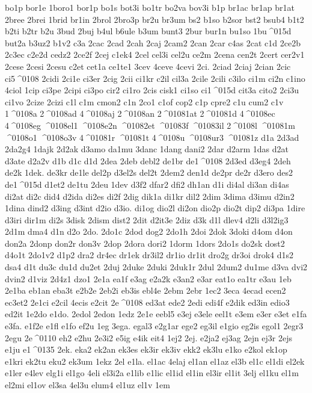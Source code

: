 {bo1p
bor1e
1boro1
bor1p
bo1s
bot3i
bo1tr
bo2va
bov3i
b1p
br1ac
br1ap
br1at
2bree
2brei
1brid
br1in
2brol
2bro3p
br2u
br3um
bs2
b1so
b2sor
bst2
bsub4
b1t2
b2ti
b2tr
b2u
3bud
2buj
b4ul
b6ule
b3um
bunt3
2bur
bur1n
bu1so
1bu^^^^015d
but2a
b3uz2
b1v2
c3a
2cac
2cad
2cah
2caj
2cam2
2can
2car
c4as
2cat
c1d
2ce2b
2c3ec
c2e2d
cedz2
2ce2f
2cej
c1ek4
2cel
cel3i
cel2u
ce2m
2cena
cen2t
2cert
cer2v1
2cese
2cesi
2cesu
c2et
cet1a
ce1te1
3cev
4ceve
4cevi
2ci.
2ciad
2ciaj
2cian
2cic
ci5^^^^0108
2cidi
2ci1e
ci3er
2cig
2cii
ci1kr
c2il
cil3a
2cile
2cili
c3ilo
ci1m
ci2n
c1ino
4ciol
1cip
ci3pe
2cipi
ci3po
cir2
ci1ro
2cis
cisk1
ci1so
ci1^^^^015d
cit3a
cito2
2ci3u
ci1vo
2cize
2cizi
c1l
c1m
cmon2
c1n
2co1
c1of
cop2
c1p
cpre2
c1u
cum2
c1v
1^^^^0108a
2^^^^0108ad
4^^^^0108aj
2^^^^0108an
2^^^^01081at
2^^^^01081d
4^^^^0108ec
4^^^^0108eg
^^^^0108el1
^^^^0108e2n
^^^^01082et
^^^^01083f
^^^^01083il
2^^^^0108l
^^^^01081m
^^^^0108o1
^^^^0108o3v
4^^^^01081r
^^^^01081t
4^^^^0108u
^^^^0108ur3
^^^^01081z
d1a
2d3ad
2da2g4
1dajk
2d2ak
d3amo
da1mu
3danc
1dang
dani2
2dar
d2arm
1das
d2at
d3ate
d2a2v
d1b
d1c
d1d
2dea
2deb
debl2
de1br
de1^^^^0108
2d3ed
d3eg4
2deh
de2k
1dek.
de3kr
de1le
del2p
d3el2s
del2t
2dem2
den1d
de2pr
de2r
d3ero
des2
de1^^^^015d
d1et2
de1tu
2deu
1dev
d3f2
dfar2
dfi2
dh1an
d1i
di4al
di3an
di4as
di2at
di2c
did4
d2ida
di2es
di2f
2dig
dik1a
di1kr
dil2
2dim
3dima
d3imu
d2in2
1dina
dind2
d3ing
d3int
d2io
d3io.
di1og
dio2l
di2on
dio2p
dio2t
dip2
di3pa
1dire
d3iri
dir1m
di2s
3disk
2dism
dist2
2dit
d2it3e
2diz
d3k
d1l
dlev4
d2li
d3l2ig3
2d1m
dma4
d1n
d2o
2do.
2do1c
2dod
dog2
2do1h
2doi
2dok
3doki
d4om
d4on
don2a
2donp
don2r
don3v
2dop
2dora
dori2
1dorm
1dors
2do1s
do2sk
dost2
d4o1t
2do1v2
d1p2
dra2
dr4ec
dr1ek
dr3il2
dr1io
dr1it
dro2g
dr3oi
drok4
d1s2
dsa4
d1t
du3c
du1d
du2et
2duj
2duke
2duki
2duk1r
2dul
2dum2
du1me
d3va
dvi2
dvin2
d1viz
2d4z1
dzo1
2e1a
ea1f
e3ag
e2a2k
e3an2
e3ar
eat1o
ea1tr
e3au
1eb
2e1ba
eb1an
eba3t
e2b2e
2eb2i
eb3is
ebl4e
2ebm
2ebr
1ec2
3eca
4ecad
ecen2
ec3et2
2e1ci
e2cil
4ecis
e2cit
2e^^^^0108
ed3at
ede2
2edi
edi4f
e2dik
ed3in
edio3
ed2it
1e2do
e1do.
2edol
2edon
1edz
2e1e
eebl5
e3ej
e3ele
eel1t
e3em
e3er
e3et
e1fa
e3fa.
e1f2e
e1fl
e1fo
ef2u
1eg
3ega.
egal3
e2g1ar
ege2
eg3il
e1gio
eg2is
egol1
2egr3
2egu
2e^^^^0110
eh2
e2hu
2e3i2
e5ig
e4ik
eit4
1ej2
2ej.
e2ja2
ej3ag
2ejn
ej3r
2ejs
e1ju
e1^^^^0135 
2ek.
eka2
ek2an
ek3es
ek3ir
ek3iv
ekk2
ek3lu
e1ko
e2kol
ek1op
e1kri
ek2tu
eku2
ek3um
1ekz
2el
e1la.
el1ac
4elaj
el1an
el1az
el3b
el1c
el1di
el2ek
e1ler
e4lev
elg1i
el1go
4eli
el3i2a
e1lib
e1lic
el1id
el1in
el3ir
el1it
3elj
el1ku
el1m
el2mi
el1ov
el3sa
4el3u
elum4
el1uz
el1v
1em
}
